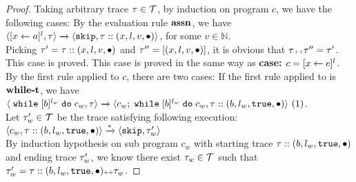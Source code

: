     \begin{proof}
      Taking arbitrary trace $\mathtt{\tau} \in \mathcal{T}$, by induction on program $c$, we have the following cases:
      By the evaluation rule $\rname{assn}$, we have
      $
      {
      \langle [\mathrel{ {x} \leftarrow a }]^{l},  \mathtt{\tau}  \rangle 
      \xrightarrow{} 
      \langle \mathtt{skip}, \mathtt{\tau} :: ({x}, l, v, \bullet) \rangle
      }$, for some $v \in \mathbb{N}$.
      \\
      Picking $\mathtt{\tau}' = \mathtt{\tau} ::({x}, l, v, \bullet)$ and $\mathtt{\tau}'' =  [({x}, l, v, \bullet) ]$,
      it is obvious that $\mathtt{\tau} {\scriptscriptstyle ++} \mathtt{\tau}'' = \mathtt{\tau}'$.
      \\
      This case is proved.
      This case is proved in the same way as \textbf{case: $c = [\mathrel{ x \leftarrow e }]^l$}.
      By the first rule applied to $c$, there are two cases:
      If the first rule applied to is $\rname{while-t}$, we have
      \\
      $\langle {\;\ensuremath{\mathtt{while}}\;[b]^{l_w} \;\ensuremath{\mathtt{do}}\;c_w, \ensuremath{\mathtt{\tau}}} \rangle
        \xrightarrow{} 
        \langle {
        c_w; \;\ensuremath{\mathtt{while}}\;[b]^{l_w} \;\ensuremath{\mathtt{do}}\;c_w,
        \ensuremath{\mathtt{\tau}}:: (b, l_w, \ensuremath{\mathtt{true}}, \bullet)} \rangle~ (1)
      $.
      \\
      Let $\mathtt{\tau}_w' \in \mathcal{T}$ be the trace satisfying following execution:
      \\
      $
      \langle {
      c_w,
      \ensuremath{\mathtt{\tau}}:: (b, l_w, \ensuremath{\mathtt{true}}, \bullet)} \rangle
      \xrightarrow{*} 
      \langle {
      \ensuremath{\mathtt{skip}}, \ensuremath{\mathtt{\tau}}_w'} \rangle
    $
    \\
    By induction hypothesis on sub program $c_w$ with starting trace 
    $\mathtt{\tau} :: (b, l_w, \mathtt{true}, \bullet)$ and ending trace $\mathtt{\tau}_w'$, 
    we know there exist
    $\mathtt{\tau}_w \in \mathcal{T}$ such that $\mathtt{\tau}_w' = \mathtt{\tau} :: (b, l_w, \mathtt{true}, \bullet) {\scriptscriptstyle ++} \mathtt{\tau}_w$.

\end{proof}
